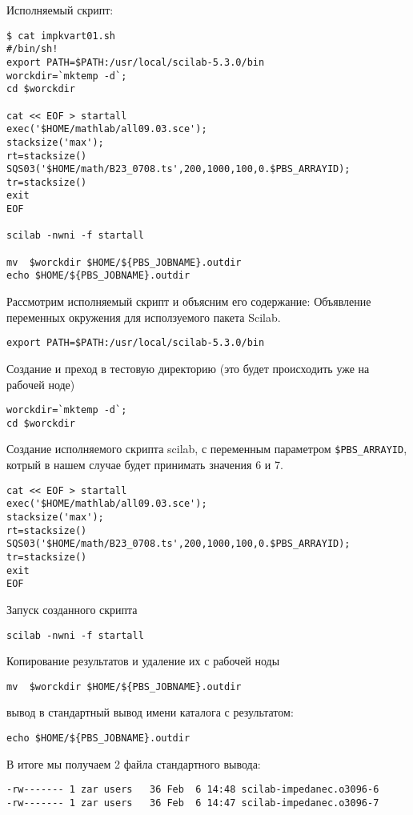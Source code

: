 \documentclass[a4paper,8pt]{extreport}
\newcounter{ex}
\begin{document}
Исполняемый скрипт:
\begin{lstlisting}
$ cat impkvart01.sh 
#/bin/sh!
export PATH=$PATH:/usr/local/scilab-5.3.0/bin
worckdir=`mktemp -d`;
cd $worckdir

cat << EOF > startall 
exec('$HOME/mathlab/all09.03.sce');
stacksize('max');
rt=stacksize()
SQS03('$HOME/math/B23_0708.ts',200,1000,100,0.$PBS_ARRAYID);
tr=stacksize()
exit
EOF

scilab -nwni -f startall

mv  $worckdir $HOME/${PBS_JOBNAME}.outdir
echo $HOME/${PBS_JOBNAME}.outdir
\end{lstlisting}

Рассмотрим исполняемый скрипт и объясним его содержание:
Объявление переменных окружения для исползуемого пакета Scilab.
\begin{lstlisting}
export PATH=$PATH:/usr/local/scilab-5.3.0/bin  
\end{lstlisting}

Создание и преход в тестовую директорию (это будет происходить уже на рабочей ноде)
\begin{lstlisting}
worckdir=`mktemp -d`;
cd $worckdir
\end{lstlisting}

Создание исполняемого скрипта scilab, с переменным параметром  \verb*|$PBS_ARRAYID|, котрый в нашем случае будет принимать значения 6 и 7.
\begin{lstlisting}
cat << EOF > startall 
exec('$HOME/mathlab/all09.03.sce');
stacksize('max');
rt=stacksize()
SQS03('$HOME/math/B23_0708.ts',200,1000,100,0.$PBS_ARRAYID);
tr=stacksize()
exit
EOF
\end{lstlisting}

Запуск созданного скрипта
\begin{lstlisting}
scilab -nwni -f startall
\end{lstlisting}

Копирование результатов и удаление их с рабочей ноды 
\begin{lstlisting}
mv  $worckdir $HOME/${PBS_JOBNAME}.outdir
\end{lstlisting}

вывод в стандартный вывод имени каталога с результатом:
\begin{lstlisting}
echo $HOME/${PBS_JOBNAME}.outdir
\end{lstlisting}

В итоге мы получаем 2 файла стандартного вывода:
\begin{lstlisting}
-rw------- 1 zar users   36 Feb  6 14:48 scilab-impedanec.o3096-6
-rw------- 1 zar users   36 Feb  6 14:47 scilab-impedanec.o3096-7
\end{lstlisting}
\end{document}
